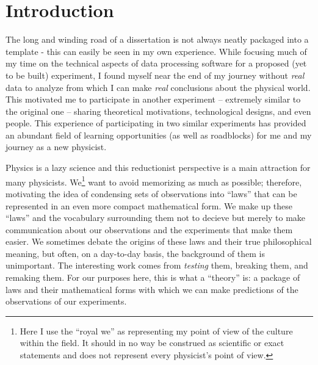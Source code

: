 \chapter{Introduction}
\label{chapter:intro}

The long and winding road of a dissertation is not always neatly packaged into a
template - this can easily be seen in my own experience. While focusing much
of my time on the technical aspects of data processing software for a proposed (yet
to be built) experiment, I found myself near the end of my journey without \emph{real}
data to analyze from which I can make \emph{real} conclusions about the physical world.
This motivated me to participate in another experiment -- extremely similar to the original
one -- sharing theoretical motivations, technological designs, and even people. This
experience of participating in two similar experiments has provided an abundant
field of learning opportunities (as well as roadblocks) for me and my journey as a new physicist.

Physics is a lazy science and this reductionist perspective is a main attraction for many physicists.
We\footnote{
    Here I use the ``royal we'' as representing my point of view of the culture within the field.
    It should in no way be construed as scientific or exact statements and does not represent every
    physicist's point of view.
} want to avoid memorizing as much as possible; therefore, motivating the idea of condensing sets
of observations into ``laws'' that can be represented in an even more compact mathematical form.
We make up these ``laws'' and the vocabulary surrounding them not to decieve but merely to make
communication about our observations and the experiments that make them easier. We sometimes
debate the origins of these laws and their true philosophical meaning, but often, on a day-to-day
basis, the background of them is unimportant. The interesting work comes from \emph{testing} them,
breaking them, and remaking them. For our purposes here, this is what a ``theory'' is: a package
of laws and their mathematical forms with which we can make predictions of the observations of
our experiments.

